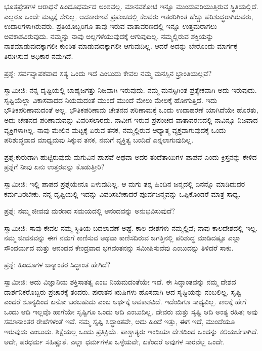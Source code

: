 ಭೂತಪ್ರೇತಗಳ ಆರಾಧನೆ ಹಿಂದೂಧರ್ಮದ ಅಂಶವಲ್ಲ. ಮಾನವಕೋಟಿ ಇನ್ನೂ ಮುಂದುವರಿಯುತ್ತಿರುವ ಸ್ಥಿತಿಯಲ್ಲಿದೆ. ಎಲ್ಲರೂ ಒಂದೇ ಮಟ್ಟಕ್ಕೆ ಸೇರಿಲ್ಲ. ಆದಕಾರಣವೆ ಪ್ರಪಂಚದಲ್ಲಿ ಕೆಲವರು ಇತರರಿಗಿಂತ ಹೆಚ್ಚು ಪರಿಶುದ್ಧರಾಗಿರುವರು, ಉದಾರಿಗಳಾಗಿರುವರು. ಪ್ರತಿಯೊಬ್ಬರಿಗೂ ತಾವು ಇರುವ ವಾತಾವರಣದಲ್ಲಿ ಇನ್ನೂ ಉತ್ತಮರಾಗಲು ಅವಕಾಶವಿರುವುದು. ನಮ್ಮನ್ನು ನಾವು ಅಲ್ಲಗಳೆಯುವುದಕ್ಕೆ ಆಗುವುದಿಲ್ಲ. ನಮ್ಮಲ್ಲಿರುವ ಶಕ್ತಿಯನ್ನು ನಾಶಮಾಡುವುದಕ್ಕಾಗಲೀ ಕುಂಠಿತ ಮಾಡುವುದಕ್ಕಾಗಲೀ ಆಗುವುದಿಲ್ಲ. ಆದರೆ ಅದನ್ನು ಬೇರೊಂದು ಮಾರ್ಗಕ್ಕೆ ತಿರುಗಿಸುವ ಅಧಿಕಾರ ನಮಗಿದೆ.

ಪ್ರಶ್ನೆ: ಸರ್ವವ್ಯಾಪಕವಾದ ಸತ್ಯ ಒಂದು ಇದೆ ಎಂಬುದು ಕೇವಲ ನಮ್ಮ ಮನಸ್ಸಿನ ಭ್ರಾಂತಿಯಲ್ಲವೆ?

ಸ್ವಾಮೀಜಿ: ನನ್ನ ದೃಷ್ಟಿಯಲ್ಲಿ ಬಾಹ್ಯಜಗತ್ತು ನಿಜವಾಗಿ ಇರುವುದು. ನಮ್ಮ ಮನಸ್ಸಿಗಿಂತ ಪ್ರತ್ಯೇಕವಾಗಿ ಅದು ಇರುವುದು. ಸೃಷ್ಟಿಯೆಲ್ಲಾ ವಿಕಾಸವಾದದ ನಿಯಮದಂತೆ ಮುಂದೆ ಮುಂದೆ ಮೇಲು ಮೇಲಕ್ಕೆ ಹೋಗುತ್ತಿದೆ. ಇದು ಭೌತಿಕಪರಿಣಾಮದಂತೆ ಅಲ್ಲ. ಭೌತಿಕಪರಿಣಾಮ ಚೇತನದ ಪರಿಣಾಮಕ್ಕೆ ಒಂದು ಉದಾಹರಣೆ ಯಾಗಿದೆಯೇ ಹೊರತು, ಅದು ಚೇತನದ ಪರಿಣಾಮವನ್ನು ವಿವರಿಸಲಾರದು. ನಾವೀಗ ಇರುವ ಪ್ರಪಂಚದ ವಾತಾವರಣದಲ್ಲಿ ನಾವಿನ್ನೂ ನಿಜವಾದ ವ್ಯಕ್ತಿಗಳಾಗಿಲ್ಲ. ನಾವು ಮೇಲಿನ ಮಟ್ಟಕ್ಕೆ ಏರುವ ತನಕ, ನಮ್ಮಲ್ಲಿರುವ ಆಧ್ಯಾತ್ಮ ವ್ಯಕ್ತವಾಗುವುದಕ್ಕೆ ಒಂದು ಪರಿಶುದ್ಧವಾದ ಮಾಧ್ಯಮವು ಸಿಕ್ಕುವ ತನಕ, ನಮಗೆ ವ್ಯಕ್ತಿತ್ವ ಬಂದಿದೆ ಎನ್ನಲಾಗುವುದಿಲ್ಲ.

ಪ್ರಶ್ನೆ:ಕುರುಡಾಗಿ ಹುಟ್ಟಿರುವುದು ಮಗುವಿನ ಪಾಪವೆ ಅಥವಾ ಅದರ ತಂದೆತಾಯಿಗಳ ಪಾಪವೆ ಎಂದು ಕ್ರಿಸ್ತನನ್ನು ಕೇಳಿದ ಪ್ರಶ್ನೆಗೆ ನೀವು ಏನು ಉತ್ತರವನ್ನು ಕೊಡುತ್ತೀರಿ?

ಸ್ವಾಮೀಜಿ: ಇಲ್ಲಿ ಪಾಪದ ಪ್ರಶ್ನೆಯೇನೂ ಏಳುವುದಿಲ್ಲ. ಆ ಮಗು ತನ್ನ ಹಿಂದಿನ ಜನ್ಮದಲ್ಲಿ ಏನನ್ನೊ ಮಾಡಿದುದರ ಕರ್ಮವಿರಬೇಕು. ನನ್ನ ದೃಷ್ಟಿಯಲ್ಲಿ ಇದನ್ನು ವಿವರಿಸಬೇಕಾದರೆ ಪೂರ್ವಜನ್ಮವನ್ನು ಒಪ್ಪಿಕೊಂಡರೆ ಮಾತ್ರ ಸಾಧ್ಯ.

ಪ್ರಶ್ನೆ: ನಮ್ಮ ಜೀವವು ಮರಣದ ಸಮಯದಲ್ಲಿ ಆನಂದವನ್ನು ಅನುಭವಿಸುವುದೆ?

ಸ್ವಾಮೀಜಿ: ಸಾವು ಕೇವಲ ನಮ್ಮ ಸ್ಥಿತಿಯ ಬದಲಾವಣೆ ಅಷ್ಟೆ. ಕಾಲ ದೇಶಗಳು ನಮ್ಮಲ್ಲಿವೆ; ನಾವು ಕಾಲದೇಶದಲ್ಲಿ ಇಲ್ಲ. ನಮ್ಮ ಜೀವನವನ್ನು ಈಗ ನಮಗೆ ಕಾಣಿಸುವ ಅಥವಾ ಕಾಣಿಸದಿರುವ ಜಗತ್ತಿನಲ್ಲಿ ಪರಿಶುದ್ಧ ಮಾಡಿದಷ್ಟೂ ಎಲ್ಲಾ ಸೌಂದರ್ಯದ ಮತ್ತು ಆನಂದದ ಕೇಂದ್ರವಾದ ಭಗವಂತನನ್ನು ಸಮೀಪಿಸುವೆವು ಎಂಬುದನ್ನು ತಿಳಿದರೆ ಸಾಕು.

ಪ್ರಶ್ನೆ: ಹಿಂದೂಗಳ ಜನ್ಮಾಂತರ ಸಿದ್ಧಾಂತ ಹೇಗಿದೆ?

ಸ್ವಾಮೀಜಿ: ಅದು ವಿಜ್ಞಾನಿಯ ಶಕ್ತಿಸಾತತ್ಯ  ಎಂಬ ನಿಯಮದಂತೆಯೇ ಇದೆ. ಈ ಸಿದ್ಧಾಂತವನ್ನು ನಮ್ಮ ದೇಶದ ದಾರ್ಶನಿಕರೊಬ್ಬರು ಪ್ರಚಾರಕ್ಕೆ ತಂದರು. ಪುರಾತನ ಋಷಿಗಳು ಹೊಸದಾಗಿ ಆದ ಸೃಷ್ಟಿಯನ್ನು ನಂಬಲಿಲ್ಲ. ಸೃಷ್ಟಿ ಎಂದರೆ ಶೂನ್ಯದಿಂದ ಏನೋ ಬರಬಹುದು ಎಂಬ ಅರ್ಥಕ್ಕೆ ಅವಕಾಶವಿದೆ. ಇದೆಂದಿಗೂ ಸಾಧ್ಯವಿಲ್ಲ. ಕಾಲಕ್ಕೆ ಹೇಗೆ ಒಂದು ಆದಿ ಇಲ್ಲವೊ ಹಾಗೆಯೇ ಸೃಷ್ಟಿಗೂ ಒಂದು ಆದಿ ಎಂಬುದಿಲ್ಲ. ದೇವರು ಮತ್ತು ಸೃಷ್ಟಿ ಆದಿ ಅಂತ್ಯ ರಹಿತ; ಅವು ಸಮಾನಾಂತರ ರೇಖೆಗಳಂತೆ ಇವೆ. ನಮ್ಮ ಸೃಷ್ಟಿ ಸಿದ್ಧಾಂತವೇ, ಅದು ಹಿಂದೆ ಇತ್ತು, ಈಗ ಇದೆ, ಮುಂದೆಯೂ ಇರುವುದು ಎಂಬುದು. ಶಿಕ್ಷೆಯಲ್ಲ ಒಂದು ಪ್ರತಿಕ್ರಿಯೆ. ಪಾಶ್ಚಾತ್ಯರು ಇಂಡಿಯಾ ದೇಶದಿಂದ ಒಂದನ್ನು ಕಲಿಯಬೇಕಾಗಿದೆ. ಅದೇ, ಪರಧರ್ಮ ಸಹಿಷ್ಣುತೆ. ಎಲ್ಲಾ ಧರ್ಮಗಳೂ ಒಳ್ಳೆಯವೇ, ಏಕೆಂದರೆ ಅವುಗಳ ಸಾರವೆಲ್ಲ ಒಂದೇ.

